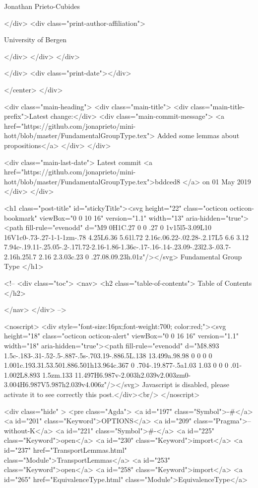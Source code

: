                   Jonathan Prieto-Cubides
                
              </div>
              <div class="print-author-affiliation">
                
                  University of Bergen
                
                </div>
            </div>
          </div>
          
          
        </div>
        <div class="print-date"></div>
        
        
    </center>
  </div>

  
  <div class="main-heading">
    <div class="main-title">
      <div class="main-title-prefix">Latest change:</div>
      <div class="main-commit-message">
            <a href="https://github.com/jonaprieto/mini-hott/blob/master/FundamentalGroupType.tex">
              Added some lemmas about propositions</a>
      </div>
    </div>

    <div class="main-last-date">
      Latest commit <a href="https://github.com/jonaprieto/mini-hott/blob/master/FundamentalGroupType.tex">bddced8 </a> on  01 May 2019
    </div>
  </div>
  
  <h1 class="post-title" id="stickyTitle"><svg height="22" class="octicon octicon-bookmark" viewBox="0 0 10 16" version="1.1" width="13" aria-hidden="true"><path fill-rule="evenodd" d="M9 0H1C.27 0 0 .27 0 1v15l5-3.09L10 16V1c0-.73-.27-1-1-1zm-.78 4.25L6.36 5.61l.72 2.16c.06.22-.02.28-.2.17L5 6.6 3.12 7.94c-.19.11-.25.05-.2-.17l.72-2.16-1.86-1.36c-.17-.16-.14-.23.09-.23l2.3-.03.7-2.16h.25l.7 2.16 2.3.03c.23 0 .27.08.09.23h.01z"/></svg> Fundamental Group Type
  </h1>

  <!-- 
  <div class="toc">
    <nav>
    <h2 class="table-of-contents"> Table of Contents </h2>
      

    </nav>
  </div>
   -->

  <noscript>
  <div style="font-size:16px;font-weight:700; color:red;"><svg height="18" class="octicon octicon-alert" viewBox="0 0 16 16" version="1.1" width="18" aria-hidden="true"><path fill-rule="evenodd" d="M8.893 1.5c-.183-.31-.52-.5-.887-.5s-.703.19-.886.5L.138 13.499a.98.98 0 0 0 0 1.001c.193.31.53.501.886.501h13.964c.367 0 .704-.19.877-.5a1.03 1.03 0 0 0 .01-1.002L8.893 1.5zm.133 11.497H6.987v-2.003h2.039v2.003zm0-3.004H6.987V5.987h2.039v4.006z"/></svg> Javascript is disabled, please activate it to see correctly this post.</div><br/>
  </noscript>

  <div class="hide" >
<pre class="Agda">
<a id="197" class="Symbol">{-#</a> <a id="201" class="Keyword">OPTIONS</a> <a id="209" class="Pragma">--without-K</a> <a id="221" class="Symbol">#-}</a>
<a id="225" class="Keyword">open</a> <a id="230" class="Keyword">import</a> <a id="237" href="TransportLemmas.html" class="Module">TransportLemmas</a>
<a id="253" class="Keyword">open</a> <a id="258" class="Keyword">import</a> <a id="265" href="EquivalenceType.html" class="Module">EquivalenceType</a>

